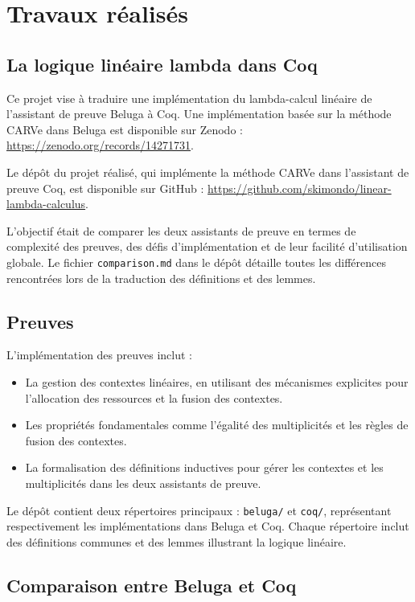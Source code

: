 %
\chapter{Travaux réalisés}
\label{sec::chapitre4}

\section{La logique linéaire lambda dans Coq}

Ce projet vise à traduire une implémentation du lambda-calcul linéaire de l'assistant de preuve Beluga à Coq. Une implémentation basée sur la méthode CARVe dans Beluga est disponible sur Zenodo :
\url{https://zenodo.org/records/14271731}.

Le dépôt du projet réalisé, qui implémente la méthode CARVe dans l'assistant de preuve Coq, est disponible sur GitHub : \url{https://github.com/skimondo/linear-lambda-calculus}.

L'objectif était de comparer les deux assistants de preuve en termes de complexité des preuves, des défis d'implémentation et de leur facilité d'utilisation globale. Le fichier \texttt{comparison.md} dans le dépôt détaille toutes les différences rencontrées lors de la traduction des définitions et des lemmes.

\section{Preuves}

L'implémentation des preuves inclut :
\begin{itemize}
    \item La gestion des contextes linéaires, en utilisant des mécanismes explicites pour l'allocation des ressources et la fusion des contextes.
    \item Les propriétés fondamentales comme l'égalité des multiplicités et les règles de fusion des contextes.
    \item La formalisation des définitions inductives pour gérer les contextes et les multiplicités dans les deux assistants de preuve.
\end{itemize}

Le dépôt contient deux répertoires principaux : \texttt{beluga/} et \texttt{coq/}, représentant respectivement les implémentations dans Beluga et Coq. Chaque répertoire inclut des définitions communes et des lemmes illustrant la logique linéaire.

\section{Comparaison entre Beluga et Coq}

